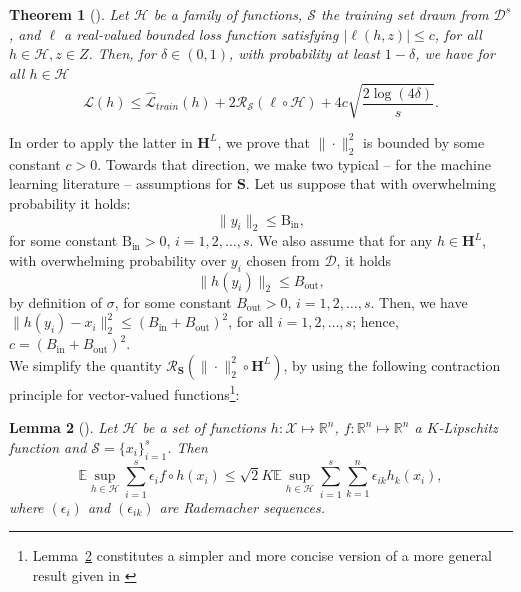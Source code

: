 \documentclass[preprint,12pt]{elsarticle}
\newtheorem{theorem}{Theorem}[section]
\newtheorem{lemma}[theorem]{Lemma}
\begin{document}
\begin{theorem}[{\cite[Theorem 26.5]{shalev}}]\label{radem}
Let $\mathcal{H}$ be a family of functions, $\mathcal{S}$ the training set drawn from $\mathcal{D}^s$, and $\ell$ a real-valued bounded loss function satisfying $|\ell(h,z)|\leq c$, for all $h\in\mathcal{H}, z\in Z$. Then, for $\delta\in(0,1)$, with probability at least $1-\delta$, we have for all $h\in\mathcal{H}$
\begin{equation}
    \mathcal{L}(h)\leq\mathcal{\hat{L}}_{train}(h)+2\mathcal{R}_{\mathcal{S}}(\ell\circ\mathcal{H})+4c\sqrt{\frac{2\log(4\delta)}{s}}.
\end{equation}
\end{theorem}

In order to apply the latter in $\mathbf{H}^L$, we prove that $\|\cdot\|_2^2$ is bounded by some constant $c>0$. Towards that direction, we make two typical -- for the machine learning literature -- assumptions for $\mathbf{S}$. Let us suppose that with overwhelming probability it holds:
\begin{equation}
    \label{ybound}
    \|y_i\|_2\leq\mathrm{B_{in}},
\end{equation}
for some constant $\mathrm{B_{in}}>0$, $i=1,2,\hdots,s$. We also assume that for any $h\in\mathbf{H}^L$, with overwhelming probability over $y_i$ chosen from $\mathcal{D}$, it holds
\begin{equation}\label{hbound}
    \|h(y_i)\|_2\leq B_{\text{out}},
\end{equation}
by definition of $\sigma$, for some constant $B_{\text{out}}>0$, $i=1,2,\hdots,s$. Then, we have $\|h(y_i)-x_i\|_2^2\leq (B_{\text{in}}+B_{\text{out}})^2$, for all $i=1,2,\hdots,s$; hence, $c=(B_{\text{in}}+B_{\text{out}})^2$.\\
We simplify the quantity $\mathcal{R}_{\mathbf{S}}(\|\cdot\|_2^2\circ\mathbf{H}^L)$, by using the following contraction principle for vector-valued functions\footnote{Lemma~\ref{contraction} constitutes a simpler and more concise version of a more general result given in \cite{tal}}:
\begin{lemma}[{\cite[Corollary 4]{contraction}}]
\label{contraction}
Let $\mathcal{H}$ be a set of functions $h:\mathcal{X}\mapsto\mathbb{R}^n$, $f:\mathbb{R}^n\mapsto\mathbb{R}^n$ a $K$-Lipschitz function and $\mathcal{S}=\{x_i\}_{i=1}^s$. Then
\begin{equation}
    \mathbb{E}\sup_{h\in\mathcal{H}}\sum_{i=1}^s\epsilon_if\circ h(x_i)\leq\sqrt{2}K\mathbb{E}\sup_{h\in\mathcal{H}}\sum_{i=1}^s\sum_{k=1}^n\epsilon_{ik}h_k(x_i),
\end{equation}
where $(\epsilon_i)$ and $(\epsilon_{ik})$ are Rademacher sequences.
\end{lemma}
\end{document}
